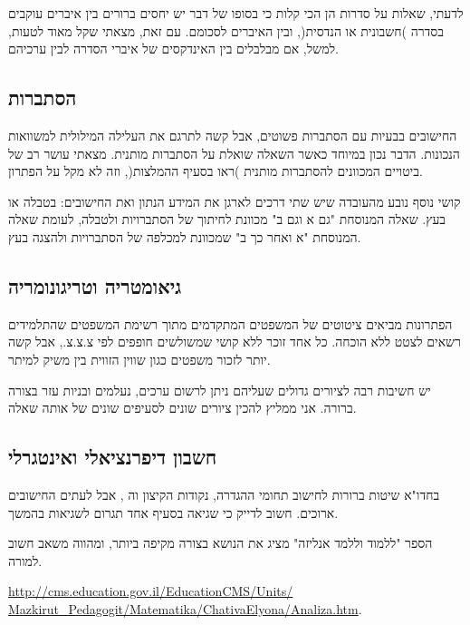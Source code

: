 לדעתי, שאלות על סדרות הן הכי קלות כי בסופו של דבר יש יחסים ברורים בין איברים עוקבים בסדרה )חשבונית או הנדסית(, ובין האיברים לסכומם. עם זאת, מצאתי שקל מאוד לטעות, למשל, אם מבלבלים בין האינדקסים של איברי הסדרה לבין ערכיהם.


\subsection*{הסתברות}

החישובים בבעיות עם הסתברות פשוטים, אבל קשה לתרגם את העלילה המילולית למשוואות הנכונות. הדבר נכון במיוחד כאשר השאלה שואלת על הסתברות מותנית. מצאתי עושר רב של ביטויים המכוונים להסתברות מותנית )ראו בסעיף ההמלצות(, וזה לא מקל על הפתרון.

\np

קושי נוסף נובע מהעובדה שיש שתי דרכים לארגן את המידע הנתון ואת החישובים: בטבלה או בעץ. שאלה המנוסחת "גם א וגם ב" מכוונת לחיתוך של הסתברויות ולטבלה, לעומת שאלה המנוסחת "א ואחר כך ב" שמכוונת למכלפה של הסתברויות ולהצגה בעץ.

\subsection*{גיאומטריה וטריגונומריה}


הפתרונות מביאים ציטוטים של המשפטים המתקדמים מתוך רשימת המשפטים שהתלמידים רשאים לצטט ללא הוכחה. כל אחד זוכר ללא קושי שמשולשים חופפים לפי צ.צ.צ., אבל קשה יותר לזכור משפטים כגון שווין הזווית בין משיק למיתר.

יש חשיבות רבה לציורים גדולים שעליהם ניתן לרשום ערכים, נעלמים ובניות עזר בצורה ברורה. אני ממליץ להכין ציורים שונים לסעיפים שונים של אותה שאלה.

\subsection*{חשבון דיפרנציאלי ואינטגרלי}

בחדו"א שיטות ברורות לחישוב תחומי ההגדרה, נקודות הקיצון וה%
\asms{},
אבל לעתים החישובים ארוכים. חשוב לדייק כי שגיאה בסעיף אחד תגרום לשגיאות בהמשך.

הספר "ללמוד וללמד אנליזה" מציג את הנושא בצורה מקיפה ביותר, ומהווה משאב חשוב למורה.

\begin{small}
\url{http://cms.education.gov.il/EducationCMS/Units/}\\\hspace*{3em}\url{Mazkirut_Pedagogit/Matematika/ChativaElyona/Analiza.htm}.
\end{small}

